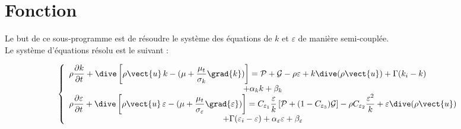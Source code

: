%
%
%
%
%
%
%
%

\vspace{1cm}
\section{Fonction}
Le but de ce sous-programme est de r\'esoudre le syst\`eme des \'equations de
$k$ et $\varepsilon$ de mani\`ere semi-coupl\'ee.\\
Le syst\`eme d'\'equations r\'esolu est le suivant :

\begin{equation}
\left\{\begin{array}{l}
\displaystyle
\rho\frac{\partial k}{\partial t} +
\dive\left[\rho \vect{u}\,k-(\mu+\frac{\mu_t}{\sigma_k}\grad{k})\right] =
\mathcal{P}+\mathcal{G}-\rho\varepsilon+k\dive(\rho\vect{u})
+\Gamma(k_i-k)\\
\multicolumn{1}{c}{+\alpha_k k +\beta_k}\\
\displaystyle
\rho\frac{\partial \varepsilon}{\partial t} +
\dive\left[\rho \vect{u}\,\varepsilon-
(\mu+\frac{\mu_t}{\sigma_\varepsilon}\grad{\varepsilon})\right] =
C_{\varepsilon_1}\frac{\varepsilon}{k}\left[\mathcal{P}
+(1-C_{\varepsilon_3})\mathcal{G}\right]
-\rho C_{\varepsilon_2}\frac{\varepsilon^2}{k}
+\varepsilon\dive(\rho\vect{u})\\
\multicolumn{1}{c}{+\Gamma(\varepsilon_i-\varepsilon)
+\alpha_\varepsilon \varepsilon +\beta_\varepsilon}
\end{array}\right.
\end{equation}


